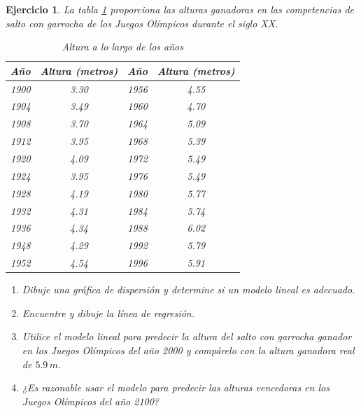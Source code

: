 \documentclass[12pt,tikz,border=5pt]{article}
\newtheorem{ejercicio}{Ejercicio}[section]
\begin{document}
\newpage
\begin{ejercicio}
  La tabla \ref{tabla:saltoGarrocha} proporciona las alturas ganadoras en las competencias de salto con garrocha de los Juegos Olímpicos durante el siglo XX.
  
\begin{table}[!hb]
    \centering
    \begin{tabular}{cccc}
        \toprule
        \textbf{Año} & \textbf{Altura (metros)} & \textbf{Año} & \textbf{Altura (metros)} \\
        \midrule
        1900 & 3.30 & 1956 & 4.55 \\
        1904 & 3.49 & 1960 & 4.70 \\
        1908 & 3.70 & 1964 & 5.09 \\
        1912 & 3.95 & 1968 & 5.39 \\
        1920 & 4.09 & 1972 & 5.49 \\
        1924 & 3.95 & 1976 & 5.49 \\
        1928 & 4.19 & 1980 & 5.77 \\
        1932 & 4.31 & 1984 & 5.74 \\
        1936 & 4.34 & 1988 & 6.02 \\
        1948 & 4.29 & 1992 & 5.79 \\
        1952 & 4.54 & 1996 & 5.91 \\
        \bottomrule
    \end{tabular}
    \caption{Altura a lo largo de los años}
    \label{tabla:saltoGarrocha}
\end{table}

\begin{enumerate}[label=(\alph*)]
  \item Dibuje una gráfica de dispersión y determine si un modelo lineal es adecuado.
  \item Encuentre y dibuje la línea de regresión.
  \item Utilice el modelo lineal para predecir la altura del salto con garrocha ganador en los Juegos Olímpicos del año 2000 y compárelo con la altura ganadora real de $5.9\,m$.
  \item ¿Es razonable usar el modelo para predecir las alturas vencedoras en los Juegos Olímpicos del año 2100?
\end{enumerate}
\end{ejercicio}



\end{document}

